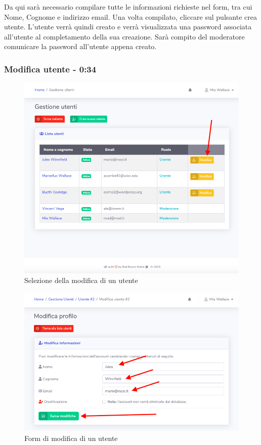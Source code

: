 	Da qui sarà necessario compilare tutte le informazioni richieste nel form, tra cui Nome, Cognome e indirizzo email.
	Una volta compilato, cliccare sul pulsante crea utente.
	L'utente verrà quindi creato e verrà visualizzata una password associata all'utente al completamento della sua creazione. Sarà compito del moderatore comunicare la password all'utente appena creato.

	\subsubsection{Modifica utente - 0:34}
		\begin{figure}[H]
		\centering
		\includegraphics[scale=0.600]{res/images/mod/selModUtente.png}
		\caption{Selezione della modifica di un utente}
	\end{figure}
	\begin{figure}[H]
		\centering
		\includegraphics[scale=0.600]{res/images/mod/modUtente.png}
		\caption{Form di modifica di un utente}
	\end{figure}
